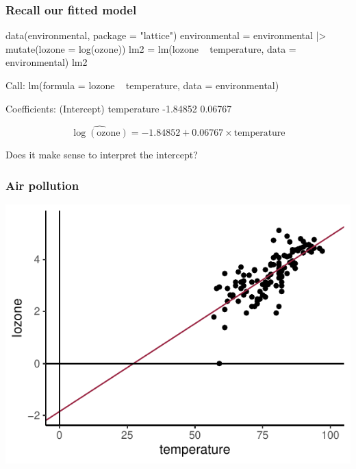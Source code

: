 \documentclass[a4paper]{article}\usepackage[]{graphicx}\usepackage[]{xcolor}
\makeatletter
\def\maxwidth{ %
  \ifdim\Gin@nat@width>\linewidth
    \linewidth
  \else
    \Gin@nat@width
  \fi
}
\makeatother
\begin{document}
\subsubsection{Recall our fitted model}
\begin{Schunk}
\begin{Sinput}
data(environmental, package = "lattice")
environmental = environmental |> 
  mutate(lozone = log(ozone))
lm2 = lm(lozone ~ temperature, data = environmental)
lm2
\end{Sinput}
\begin{Soutput}

Call:
lm(formula = lozone ~ temperature, data = environmental)

Coefficients:
(Intercept)  temperature  
   -1.84852      0.06767  
\end{Soutput}
\end{Schunk}
\[
	\widehat{\log(\text{ozone})} = -1.84852 + 0.06767\times\text{temperature}
\]
\begin{tcolorbox}[greenstylecolor, title = How do we interpret this model?]
	Does it make sense to interpret the intercept?
\end{tcolorbox}
\subsubsection{Air pollution}
\begin{Schunk}


{\centering \includegraphics[width=\maxwidth]{figure/listings-unnamed-chunk-355-1} 

}

\end{Schunk}
\end{document}
